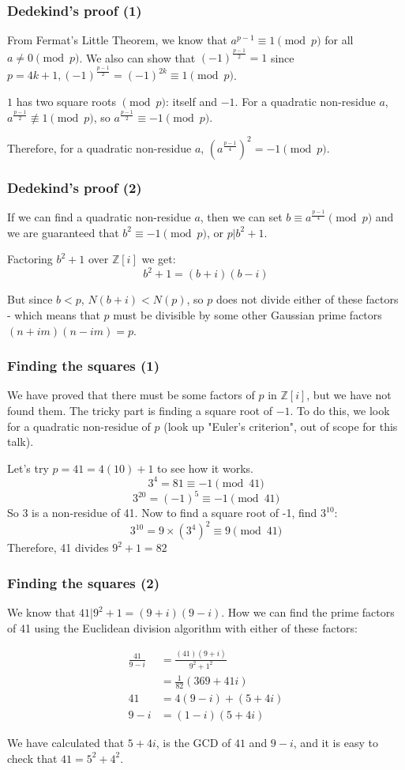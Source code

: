 \documentclass{beamer}
\begin{document}
\begin{frame}
	\frametitle{Dedekind's proof (1)}

	From Fermat's Little Theorem, we know that $a^{p-1} \equiv 1 \pmod{p}$ for all
	$a\neq 0 \pmod{p}$. We also can show that $(-1)^{\frac{p-1}{2}} = 1$ since 
	$p = 4k+1, (-1)^{\frac{p-1}{2}} = (-1)^{2k} \equiv 1 \pmod{p}$.

	$1$ has two square roots $\pmod{p}$: itself and $-1$. For a quadratic non-residue $a$,
	$a^{\frac{p-1}{2}} \not \equiv 1 \pmod{p}$, so $a^{\frac{p-1}{2}} \equiv -1 \pmod{p}$.

	Therefore, for a quadratic non-residue $a$, $(a^{\frac{p-1}{4}})^2 = -1 \pmod{p}$.

\end{frame}
\begin{frame}
	\frametitle{Dedekind's proof (2)}

	If we can find a quadratic non-residue $a$, then we can set $b \equiv a^{\frac{p-1}{4}} \pmod{p}$
	and we are guaranteed that $b^2 \equiv -1 \pmod{p}$, or $p | b^2+1$.

	Factoring $b^2+1$ over $\mathbb{Z}[i]$ we get:
	\[b^2 + 1 = (b+i)(b-i) \]
	
	But since $b<p$, $N(b+i)<N(p)$, so $p$ does not divide either of these factors - which means
	that $p$ must be divisible by some other Gaussian prime factors $(n+im)(n-im) = p$.
\end{frame}

\begin{frame}
	\frametitle{Finding the squares (1)}

	We have proved that there must be some factors of $p$ in $\mathbb{Z}[i]$, but we
	have not found them. The tricky part is finding a square root of $-1$. To do this,
	we look for a quadratic non-residue of $p$ (look up "Euler's criterion", out of
	scope for this talk).

	Let's try $p=41 = 4(10)+1$ to see how it works.
	\[ 3^4 = 81 \equiv -1 \pmod{41} \]
	\[ 3^{20} = (-1)^5 \equiv -1 \pmod{41} \]
	So 3 is a non-residue of 41. Now to find a square root of -1, find $3^{10}$:
	\[ 3^{10} = 9\times(3^4)^2 \equiv 9 \pmod{41} \]
	Therefore, 41 divides $9^2 + 1 = 82$
\end{frame}

\begin{frame}
	\frametitle{Finding the squares (2)}

	We know that $41|9^2+1 = (9+i)(9-i)$. How we can find the prime factors of 41
	using the Euclidean division algorithm with either of these factors:

	\begin{align*}
		\frac{41}{9-i} &= \frac{(41)(9+i)}{9^2+1^2} \\
		 &= \frac{1}{82}(369 + 41i) \\
		41  &= 4(9-i) + (5+4i) \\
		9-i &= (1-i)(5+4i)
	\end{align*}

	We have calculated that $5+4i$, is the GCD of $41$ and $9-i$, and it is easy to
	check that $41 = 5^2 + 4^2$.

\end{frame}
\end{document}
